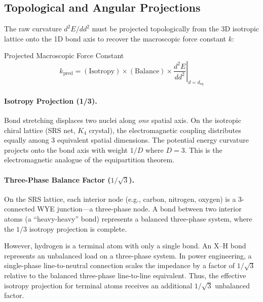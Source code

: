 \subsection{Topological and Angular Projections}

The raw curvature $d^2E/dd^2$ must be projected topologically from the 3D isotropic lattice onto the 1D bond axis to recover the macroscopic force constant $k$:
\begin{resultbox}{Projected Macroscopic Force Constant}
\begin{equation}
    k_\text{pred} = (\text{Isotropy}) \times (\text{Balance}) \times \left. \frac{d^2 E}{d d^2} \right|_{d = d_\text{eq}}
    \label{eq:projected_k}
\end{equation}
\end{resultbox}

\paragraph{Isotropy Projection (1/3).}
Bond stretching displaces two nuclei along \emph{one} spatial axis. On the isotropic chiral lattice (SRS net, $K_4$ crystal), the electromagnetic coupling distributes equally among 3 equivalent spatial dimensions. The potential energy curvature projects onto the bond axis with weight $1/D$ where $D = 3$. This is the electromagnetic analogue of the equipartition theorem.

\paragraph{Three-Phase Balance Factor ($1/\sqrt{3}$).}
On the SRS lattice, each interior node (e.g., carbon, nitrogen, oxygen) is a 3-connected WYE junction---a three-phase node. A bond between two interior atoms (a ``heavy-heavy'' bond) represents a balanced three-phase system, where the $1/3$ isotropy projection is complete.

However, hydrogen is a terminal atom with only a single bond. An X--H bond represents an unbalanced load on a three-phase system. In power engineering, a single-phase line-to-neutral connection scales the impedance by a factor of $1/\sqrt{3}$ relative to the balanced three-phase line-to-line equivalent. Thus, the effective isotropy projection for terminal atoms receives an additional $1/\sqrt{3}$ unbalanced factor.

